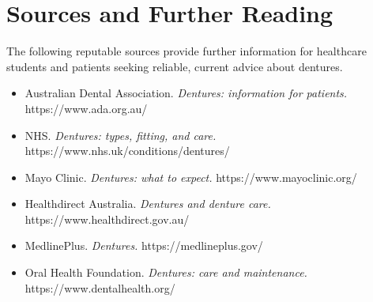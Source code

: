 \section*{Sources and Further Reading}
The following reputable sources provide further information for healthcare students and patients seeking reliable, current advice about dentures.

\begin{itemize}
    \item Australian Dental Association. \textit{Dentures: information for patients.} https://www.ada.org.au/
    \item NHS. \textit{Dentures: types, fitting, and care.} https://www.nhs.uk/conditions/dentures/
    \item Mayo Clinic. \textit{Dentures: what to expect.} https://www.mayoclinic.org/
    \item Healthdirect Australia. \textit{Dentures and denture care.} https://www.healthdirect.gov.au/
    \item MedlinePlus. \textit{Dentures.} https://medlineplus.gov/
    \item Oral Health Foundation. \textit{Dentures: care and maintenance.} https://www.dentalhealth.org/
\end{itemize}
